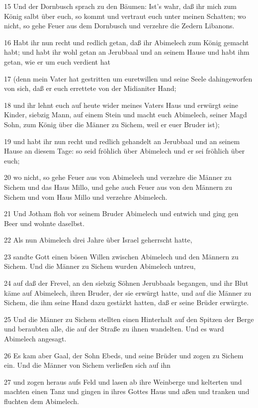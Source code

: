 \par 15 Und der Dornbusch sprach zu den Bäumen: Ist's wahr, daß ihr mich zum König salbt über euch, so kommt und vertraut euch unter meinen Schatten; wo nicht, so gehe Feuer aus dem Dornbusch und verzehre die Zedern Libanons.
\par 16 Habt ihr nun recht und redlich getan, daß ihr Abimelech zum König gemacht habt; und habt ihr wohl getan an Jerubbaal und an seinem Hause und habt ihm getan, wie er um euch verdient hat
\par 17 (denn mein Vater hat gestritten um euretwillen und seine Seele dahingeworfen von sich, daß er euch errettete von der Midianiter Hand;
\par 18 und ihr lehnt euch auf heute wider meines Vaters Haus und erwürgt seine Kinder, siebzig Mann, auf einem Stein und macht euch Abimelech, seiner Magd Sohn, zum König über die Männer zu Sichem, weil er euer Bruder ist);
\par 19 und habt ihr nun recht und redlich gehandelt an Jerubbaal und an seinem Hause an diesem Tage: so seid fröhlich über Abimelech und er sei fröhlich über euch;
\par 20 wo nicht, so gehe Feuer aus von Abimelech und verzehre die Männer zu Sichem und das Haus Millo, und gehe auch Feuer aus von den Männern zu Sichem und vom Haus Millo und verzehre Abimelech.
\par 21 Und Jotham floh vor seinem Bruder Abimelech und entwich und ging gen Beer und wohnte daselbst.
\par 22 Als nun Abimelech drei Jahre über Israel geherrscht hatte,
\par 23 sandte Gott einen bösen Willen zwischen Abimelech und den Männern zu Sichem. Und die Männer zu Sichem wurden Abimelech untreu,
\par 24 auf daß der Frevel, an den siebzig Söhnen Jerubbaals begangen, und ihr Blut käme auf Abimelech, ihren Bruder, der sie erwürgt hatte, und auf die Männer zu Sichem, die ihm seine Hand dazu gestärkt hatten, daß er seine Brüder erwürgte.
\par 25 Und die Männer zu Sichem stellten einen Hinterhalt auf den Spitzen der Berge und beraubten alle, die auf der Straße zu ihnen wandelten. Und es ward Abimelech angesagt.
\par 26 Es kam aber Gaal, der Sohn Ebeds, und seine Brüder und zogen zu Sichem ein. Und die Männer von Sichem verließen sich auf ihn
\par 27 und zogen heraus aufs Feld und lasen ab ihre Weinberge und kelterten und machten einen Tanz und gingen in ihres Gottes Haus und aßen und tranken und fluchten dem Abimelech.

